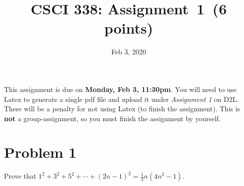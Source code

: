 \documentclass[11pt]{article}
\begin{document}
\date{Feb 3, 2020}
\title{CSCI 338: Assignment~1~(6 points)}



\maketitle

\noindent
This assignment is due on {\bf Monday, Feb 3, 11:30pm}. You will need to
use Latex to generate a single pdf file and upload it under {\em Assignment 1}
on D2L. There will be a penalty for not using Latex (to finish the assignment).
This is {\bf not} a group-assignment, so you must finish the assignment by
yourself.

\section*{Problem 1}

Prove that $1^2+3^2+5^2+\cdots+(2n-1)^2=\frac{1}{3}n(4n^2-1)$.
\newline
\end{document}
